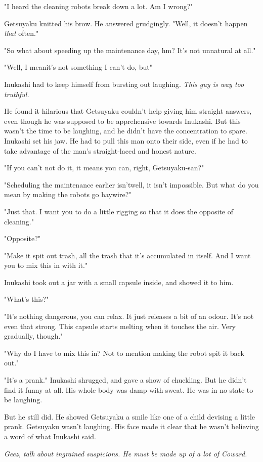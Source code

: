 "I heard the cleaning robots break down a lot. Am I wrong?"

Getsuyaku knitted his brow. He answered grudgingly. "Well, it doesn't
happen \emph{that} often."

"So what about speeding up the maintenance day, hm? It's not unnatural
at all."

"Well, I mean\el it's not something I can't do, but\el "

Inukashi had to keep himself from bursting out laughing. \emph{This guy is way
too truthful.}

He found it hilarious that Getsuyaku couldn't help giving him straight
answers, even though he was supposed to be apprehensive towards
Inukashi. But this wasn't the time to be laughing, and he didn't have
the concentration to spare. Inukashi set his jaw. He had to pull this
man onto their side, even if he had to take advantage of the man's
straight-laced and honest nature.

"If you can't not do it, it means you can, right, Getsuyaku-san?"

"Scheduling the maintenance earlier isn't\el well, it isn't impossible.
But what do you mean by making the robots go haywire?"

"Just that. I want you to do a little rigging so that it does the
opposite of cleaning."

"Opposite?"

"Make it spit out trash, all the trash that it's accumulated in itself.
And I want you to mix this in with it."

Inukashi took out a jar with a small capsule inside, and showed it to
him.

"What's this?"

"It's nothing dangerous, you can relax. It just releases a bit of an
odour. It's not even that strong. This capsule starts melting when it
touches the air. Very gradually, though."

"Why do I have to mix this in? Not to mention making the robot spit it
back out."

"It's a prank." Inukashi shrugged, and gave a show of chuckling. But he
didn't find it funny at all. His whole body was damp with sweat. He was
in no state to be laughing.

But he still did. He showed Getsuyaku a smile like one of a child
devising a little prank. Getsuyaku wasn't laughing. His face made it
clear that he wasn't believing a word of what Inukashi said.

\emph{Geez, talk about ingrained suspicions. He must be made up of a lot of
Coward.}

